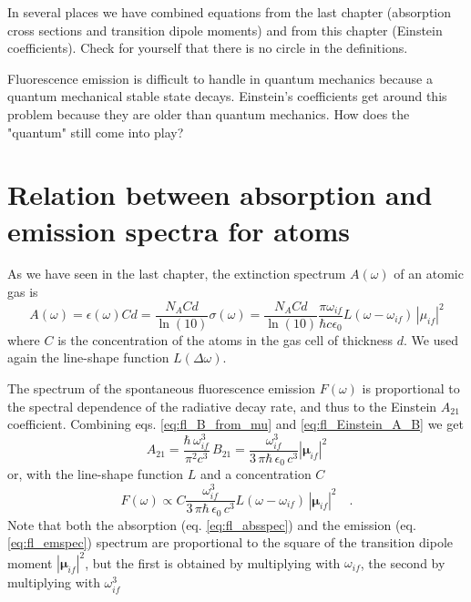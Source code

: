\begin{questions}
  \item In several places we have combined equations from the last chapter (absorption cross sections and transition dipole moments) and from this chapter (Einstein coefficients). Check for yourself that there is no circle in the definitions.
  \item Fluorescence emission is difficult to handle in quantum mechanics because a quantum mechanical stable state decays. Einstein's coefficients get around this problem because they are older than quantum mechanics. How does the "quantum" still come into play?
\end{questions}



\section{Relation between absorption and emission spectra for atoms}

As we have seen in the last chapter, the extinction spectrum $A(\omega)$ of an atomic gas is
\begin{equation}
A(\omega) = \epsilon(\omega) C d = \frac{N_A C d}{\ln(10)} \sigma(\omega) = \frac{N_A C d}{\ln(10)}
\frac{\pi \omega_{if}}{ \hbar c \epsilon_0}
  L(\omega - \omega_{if}) \, | \mu_{if} |^2 \label{eq:fl_absspec}
\end{equation}
where $C$ is the concentration of the atoms in the gas cell of thickness $d$. We used  again the line-shape function $L(\Delta \omega)$.

The  spectrum of the spontaneous fluorescence emission $F(\omega)$ is proportional to the spectral dependence of the radiative decay rate, and thus to the  Einstein $A_{21}$ coefficient. Combining eqs. \ref{eq:fl_B_from_mu} and \ref{eq:fl_Einstein_A_B} we get
\begin{equation}
 A_{21} =  \frac{\hbar \, \omega_{if}^3}{\pi^2 c^3} \, B_{21}  = 
\frac{ \omega_{if}^3}{3 \, \pi \hbar \, \epsilon_0 \, c^3}    |\mathbf{\mu}_{if} |^2  
\end{equation}
or, with the line-shape function $L$ and a concentration $C$
\begin{equation}
F(\omega) \propto C \frac{ \omega_{if}^3}{3 \, \pi \hbar \, \epsilon_0 \, c^3}   L(\omega - \omega_{if}) \,   |\mathbf{\mu}_{if} |^2  \quad . \label{eq:fl_emspec}
\end{equation}
Note that both the absorption (eq. \ref{eq:fl_absspec}) and the emission (eq. \ref{eq:fl_emspec}) spectrum are proportional to the square of the transition dipole moment $|\mathbf{\mu}_{if} |^2 $, but the first is obtained by multiplying with $\omega_{if}$, the second by multiplying with $\omega_{if}^3$

